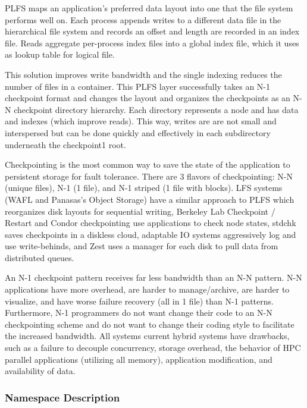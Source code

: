 PLFS maps an application's preferred data layout into one that the file system
performs well on. Each process appends writes to a different data file in the
hierarchical file system and records an offset and length are recorded in an
index file. Reads aggregate per-process index files into a global index file,
which it uses as lookup table for logical file. 

This solution improves write bandwidth and the single indexing reduces the
number of files in a container. This PLFS layer successfully takes an N-1
checkpoint format and changes the layout and organizes the checkpoints as an
N-N checkpoint directory hierarchy. Each directory represents a node and has
data and indexes (which improve reads). This way, writes are are not small and
interspersed but can be done quickly and effectively in each subdirectory
underneath the checkpoint1 root.

Checkpointing is the most common way to save the state of the application to
persistent storage for fault tolerance. There are 3 flavors of checkpointing:
N-N (unique files), N-1 (1 file), and N-1 striped (1 file with blocks). LFS
systems (WAFL and Panasas's Object Storage) have a similar approach to PLFS
which reorganizes disk layouts for sequential writing, Berkeley Lab Checkpoint
/ Restart and Condor checkpointing use applications to check node states,
stdchk saves checkpoints in a  diskless cloud, adaptable IO systems
aggressively log and use write-behinds, and Zest uses a manager for each disk
to pull data from distributed queues.

An N-1 checkpoint pattern receives far less bandwidth than an N-N pattern. N-N
applications have more overhead, are harder to manage/archive, are harder to
visualize, and have worse failure recovery (all in 1 file) than N-1 patterns.
Furthermore, N-1 programmers do not want change their code to an N-N
checkpointing scheme and do not want to change their coding style to facilitate
the increased bandwidth. All systems current hybrid systems have drawbacks,
such as a failure to decouple concurrency, storage overhead, the behavior of
HPC parallel applications (utilizing all memory), application modification, and
availability of data.

\subsubsection{Namespace Description}

